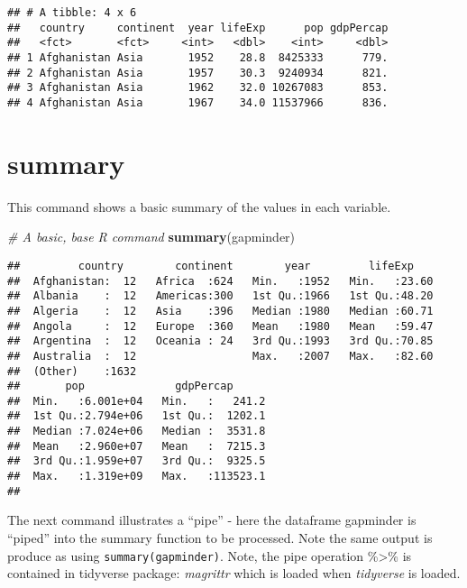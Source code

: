 \documentclass[]{book}
\newenvironment{Shaded}{\begin{snugshade}}{\end{snugshade}}
\newcommand{\KeywordTok}[1]{\textcolor[rgb]{0.13,0.29,0.53}{\textbf{#1}}}
\newcommand{\CommentTok}[1]{\textcolor[rgb]{0.56,0.35,0.01}{\textit{#1}}}
\newcommand{\NormalTok}[1]{#1}
\begin{document}
\begin{verbatim}
## # A tibble: 4 x 6
##   country     continent  year lifeExp      pop gdpPercap
##   <fct>       <fct>     <int>   <dbl>    <int>     <dbl>
## 1 Afghanistan Asia       1952    28.8  8425333      779.
## 2 Afghanistan Asia       1957    30.3  9240934      821.
## 3 Afghanistan Asia       1962    32.0 10267083      853.
## 4 Afghanistan Asia       1967    34.0 11537966      836.
\end{verbatim}

\section{summary}\label{summary}

This command shows a basic summary of the values in each variable.

\begin{Shaded}
\begin{Highlighting}[]
\CommentTok{# A basic, base R command}
\KeywordTok{summary}\NormalTok{(gapminder)}
\end{Highlighting}
\end{Shaded}

\begin{verbatim}
##         country        continent        year         lifeExp     
##  Afghanistan:  12   Africa  :624   Min.   :1952   Min.   :23.60  
##  Albania    :  12   Americas:300   1st Qu.:1966   1st Qu.:48.20  
##  Algeria    :  12   Asia    :396   Median :1980   Median :60.71  
##  Angola     :  12   Europe  :360   Mean   :1980   Mean   :59.47  
##  Argentina  :  12   Oceania : 24   3rd Qu.:1993   3rd Qu.:70.85  
##  Australia  :  12                  Max.   :2007   Max.   :82.60  
##  (Other)    :1632                                                
##       pop              gdpPercap       
##  Min.   :6.001e+04   Min.   :   241.2  
##  1st Qu.:2.794e+06   1st Qu.:  1202.1  
##  Median :7.024e+06   Median :  3531.8  
##  Mean   :2.960e+07   Mean   :  7215.3  
##  3rd Qu.:1.959e+07   3rd Qu.:  9325.5  
##  Max.   :1.319e+09   Max.   :113523.1  
## 
\end{verbatim}

The next command illustrates a ``pipe'' - here the dataframe gapminder
is ``piped'' into the summary function to be processed. Note the same
output is produce as using \texttt{summary(gapminder)}. Note, the pipe
operation \%\textgreater{}\% is contained in tidyverse package:
\emph{magrittr} which is loaded when \emph{tidyverse} is loaded.
\end{document}
